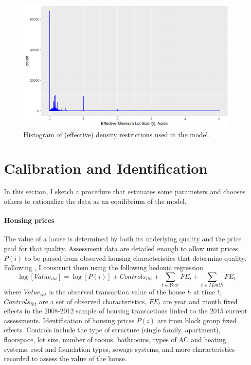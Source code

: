 \documentclass[]{article}
\begin{document}
\begin{figure}[hbpt]
	\begin{center}
		\includegraphics[width=\textwidth]{DistDensRegulation.png}
		
		\caption{Histogram of (effective) density restrictions used in the model.}\label{regHistogram}
	\end{center}
\end{figure}




\section{Calibration and Identification}\label{section:CalibrationIdent}

\paragraph*{}
In this section, I sketch a procedure that estimates some parameters and chooses others to rationalize the data as an equilibrium of the model.

\paragraph*{Housing prices} The value of a house is determined by both its underlying quality and the price paid for that quality. Assessment data are detailed enough to allow unit prices $P(i)$ to be parsed from observed housing characteristics that determine quality. Following \cite{BSH}, I construct them using the following hedonic regression
\begin{equation}
	\log[Value_{iht}] = \log[P(i)] + Controls_{iht} + \sum_{t \in Year}FE_{t} + \sum_{t \in Month}FE_{t}
\end{equation} 
where $Value_{iht}$ is the observed transaction value of the house $h$ at time $t$, $Controls_{iht}$ are a set of observed characteristics, $FE_{t}$ are year and month fixed effects in the 2008-2012 sample of housing transactions linked to the 2015 current assessments. Identification of housing prices $P(i)$ are from block group fixed effects. Controls include the type of structure (single family, apartment), floorspace, lot size, number of rooms, bathrooms, types of AC and heating systems, roof and foundation types, sewage systems, and more characteristics recorded to assess the value of the house. 
\end{document}
